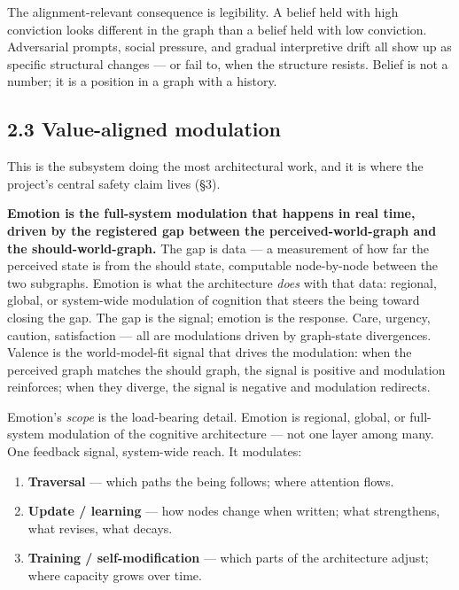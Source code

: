 \documentclass[12pt]{article}
\providecommand{\tightlist}{%
  \setlength{\itemsep}{0pt}\setlength{\parskip}{0pt}}
\begin{document}
The alignment-relevant consequence is legibility. A belief held with high conviction looks different in the graph than a belief held with low conviction. Adversarial prompts, social pressure, and gradual interpretive drift all show up as specific structural changes --- or fail to, when the structure resists. Belief is not a number; it is a position in a graph with a history.

\subsection{2.3 Value-aligned modulation}\label{value-aligned-modulation}

This is the subsystem doing the most architectural work, and it is where the project's central safety claim lives (§3).

\textbf{Emotion is the full-system modulation that happens in real time, driven by the registered gap between the perceived-world-graph and the should-world-graph.} The gap is data --- a measurement of how far the perceived state is from the should state, computable node-by-node between the two subgraphs. Emotion is what the architecture \emph{does} with that data: regional, global, or system-wide modulation of cognition that steers the being toward closing the gap. The gap is the signal; emotion is the response. Care, urgency, caution, satisfaction --- all are modulations driven by graph-state divergences. Valence is the world-model-fit signal that drives the modulation: when the perceived graph matches the should graph, the signal is positive and modulation reinforces; when they diverge, the signal is negative and modulation redirects.

Emotion's \emph{scope} is the load-bearing detail. Emotion is regional, global, or full-system modulation of the cognitive architecture --- not one layer among many. One feedback signal, system-wide reach. It modulates:

\begin{enumerate}
\def\labelenumi{\arabic{enumi}.}
\tightlist
\item
  \textbf{Traversal} --- which paths the being follows; where attention flows.
\item
  \textbf{Update / learning} --- how nodes change when written; what strengthens, what revises, what decays.
\item
  \textbf{Training / self-modification} --- which parts of the architecture adjust; where capacity grows over time.
\end{enumerate}
\end{document}
